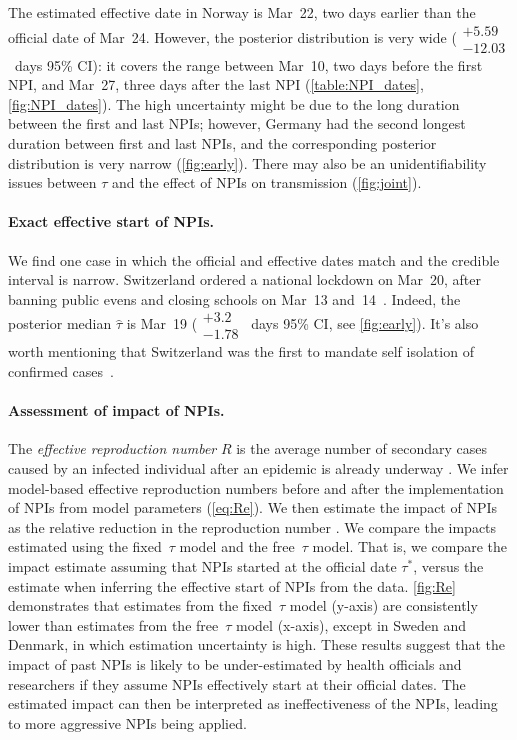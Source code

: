 \documentclass[12pt]{extarticle}
\begin{document}
The estimated effective date in Norway is Mar~22, two days earlier than the official date of Mar~24.
However, the posterior distribution is very wide ($\substack{+5.59 \\ -12.03}$~days 95\% CI): it covers the range between Mar~10, two days before the first NPI, and Mar~27, three days after the last NPI (\autoref{table:NPI_dates}, \autoref{fig:NPI_dates}). 
The high uncertainty might be due to the long duration between the first and last NPIs; however, Germany had the second longest duration between first and last NPIs, and the corresponding posterior distribution is very narrow (\autoref{fig:early}).
There may also be an unidentifiability issues between $\tau$ and the effect of NPIs on transmission (\autoref{fig:joint}). 



\paragraph*{Exact effective start of NPIs.}
We find one case in which the official and effective dates match and the credible interval is narrow.
Switzerland ordered a national lockdown on Mar~20, after banning public evens and closing schools on Mar~13 and~14~\citep{Flaxman2020}.
Indeed, the posterior median $\hat{\tau}$ is Mar~19 ($\substack{+3.2 \\ -1.78}$~days 95\% CI, see \autoref{fig:early}). It's also worth mentioning that Switzerland was the first to mandate self isolation of confirmed cases~\citep{Flaxman2020}.



\paragraph*{Assessment of impact of NPIs.}

The \emph{effective reproduction number} $R$ is the average number of secondary
cases caused by an infected individual after an epidemic is already underway \citep{Bar-On2020a}.
We infer model-based effective reproduction numbers before and after the implementation of NPIs from model parameters (\autoref{eq:Re}).
We then estimate the impact of NPIs as the relative reduction in the reproduction number \citep{Flaxman2020}. 
We compare the impacts estimated using the fixed~$\tau$ model and the free~$\tau$ model.
That is, we compare the impact estimate assuming that NPIs started at the official date $\tau^*$, versus the estimate when inferring the effective start of NPIs from the data.
\autoref{fig:Re} demonstrates that estimates from the fixed~$\tau$ model (y-axis) are consistently lower than estimates from the free~$\tau$ model (x-axis), except in Sweden and Denmark, in which estimation uncertainty is high.
These results suggest that the impact of past NPIs is likely to be under-estimated by health officials and researchers if they assume NPIs effectively start at their official dates.
The estimated impact can then be interpreted as ineffectiveness of the NPIs, leading to more aggressive NPIs being applied.
\end{document}
